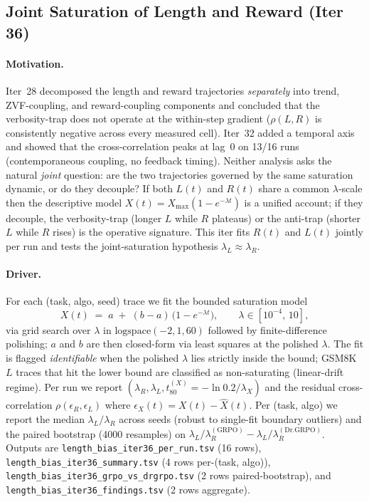 \subsection{Joint Saturation of Length and Reward (Iter 36)}
\label{sec:length-bias-iter36}

\paragraph{Motivation.}
Iter~28 decomposed the length and reward trajectories \emph{separately}
into trend, ZVF-coupling, and reward-coupling components and concluded
that the verbosity-trap does not operate at the within-step gradient
($\rho(L, R)$ is consistently negative across every measured cell).
Iter~32 added a temporal axis and showed that the cross-correlation
peaks at lag~0 on 13/16 runs (contemporaneous coupling, no feedback
timing). Neither analysis asks the natural \emph{joint} question: are
the two trajectories governed by the same saturation dynamic, or do
they decouple? If both $L(t)$ and $R(t)$ share a common
$\lambda$-scale then the descriptive model $X(t) = X_{\max}(1 -
e^{-\lambda t})$ is a unified account; if they decouple, the
verbosity-trap (longer $L$ while $R$ plateaus) or the anti-trap
(shorter $L$ while $R$ rises) is the operative signature. This iter
fits $R(t)$ and $L(t)$ jointly per run and tests the joint-saturation
hypothesis $\lambda_L \approx \lambda_R$.

\paragraph{Driver.}
For each (task, algo, seed) trace we fit the bounded
saturation model
\begin{equation}
  X(t) \;=\; a \;+\; (b - a)\,\bigl(1 - e^{-\lambda t}\bigr),
  \qquad \lambda \in [10^{-4},\, 10],
\end{equation}
via grid search over $\lambda$ in $\mathrm{logspace}(-2, 1, 60)$
followed by finite-difference polishing; $a$ and $b$ are then
closed-form via least squares at the polished $\lambda$. The fit is
flagged \emph{identifiable} when the polished $\lambda$ lies strictly
inside the bound; GSM8K $L$ traces that hit the lower bound are
classified as non-saturating (linear-drift regime). Per run we report
$(\lambda_R, \lambda_L, t_{80}^{(X)} = -\ln 0.2 / \lambda_X)$ and the
residual cross-correlation $\rho(\epsilon_R, \epsilon_L)$ where
$\epsilon_X(t) = X(t) - \hat{X}(t)$. Per (task, algo) we report the
median $\lambda_L/\lambda_R$ across seeds (robust to single-fit
boundary outliers) and the paired bootstrap (4000 resamples) on
$\lambda_L/\lambda_R^{(\mathrm{GRPO})} - \lambda_L/\lambda_R^{(\mathrm{Dr.GRPO})}$.
Outputs are \texttt{length\_bias\_iter36\_per\_run.tsv} (16 rows),
\texttt{length\_bias\_iter36\_summary.tsv} (4 rows per-(task, algo)),
\texttt{length\_bias\_iter36\_grpo\_vs\_drgrpo.tsv} (2 rows
paired-bootstrap), and \texttt{length\_bias\_iter36\_findings.tsv} (2
rows aggregate).

